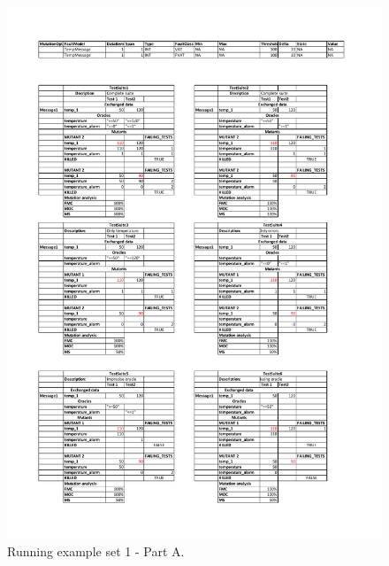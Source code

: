 \begin{figure}[tb]
\centering
\includegraphics[width=18cm]{damat/DataDrivenExample1A}
\caption{Running example set 1 - Part A.}
\label{fig:damat:RunningExample1A}
\end{figure}


